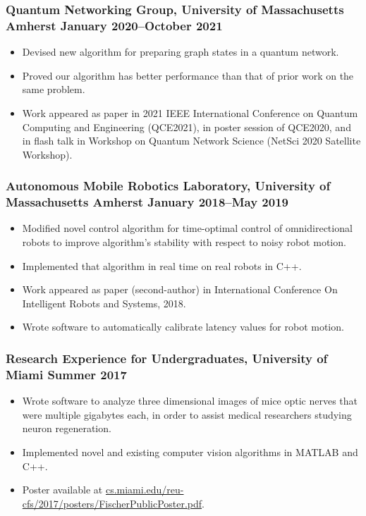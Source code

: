 \documentclass{article}
\begin{document}
		\subsubsection*{Quantum Networking Group, University of Massachusetts Amherst \hfill \normalfont \normalsize January 2020--October 2021}
			\begin{itemize}
				\item Devised new algorithm for preparing graph states in a quantum network.
				\item Proved our algorithm has better performance than that of prior work on the same problem.
				\item Work appeared as paper in 2021 IEEE International Conference on Quantum Computing and Engineering (QCE2021), in poster session of QCE2020, and in flash talk in Workshop on Quantum Network Science (NetSci 2020 Satellite Workshop).
			\end{itemize}
		\subsubsection*{Autonomous Mobile Robotics Laboratory, University of Massachusetts Amherst \hfill \normalfont \normalsize January 2018--May 2019}
			\begin{itemize}
				\item Modified novel control algorithm for time-optimal control of omnidirectional robots to improve algorithm's stability with respect to noisy robot motion.
				\item Implemented that algorithm in real time on real robots in C++.
				\item Work appeared as paper (second-author) in International Conference On Intelligent Robots and Systems, 2018.
				\item Wrote software to automatically calibrate latency values for robot motion.
			\end{itemize}
		\subsubsection*{Research Experience for Undergraduates, University of Miami \hfill \normalfont \normalsize Summer 2017}
			\begin{itemize}
				\item Wrote software to analyze three dimensional images of mice optic nerves that were multiple gigabytes each, in order to assist medical researchers studying neuron regeneration.
				\item Implemented novel and existing computer vision algorithms in MATLAB and C++.
				\item Poster available at \href{http://cs.miami.edu/reu-cfs/2017/posters/FischerPublicPoster.pdf}{cs.miami.edu/reu-cfs/2017/posters/FischerPublicPoster.pdf}.
			\end{itemize}
	
\end{document}
